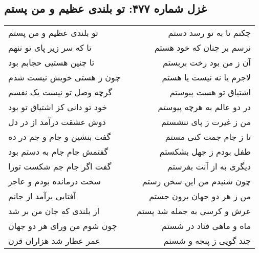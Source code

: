 \begin{center}
\section*{غزل شماره ۴۷۷: تو بلندی عظیم و من پستم}
\label{sec:477}
\begin{longtable}{l p{0.5cm} r}
تو بلندی عظیم و من پستم
&&
چکنم تا به تو رسد دستم
\\
تا که سر زیر پای تو ننهم
&&
نرسم بر چنان که خود هستم
\\
تا چنین هستیی حجابم بود
&&
آن ز من بود رخت بربستم
\\
چون ز هستی خویش نیست شدم
&&
لاجرم یا نه نیست یا هستم
\\
گرچه وصل تو نیست یک نفسم
&&
اشتیاق تو هست پیوستم
\\
خود تو دانی کز اشتیاق تو بود
&&
در دو عالم به هرچه پیوستم
\\
دوش عشقت درآمد از در دل
&&
من ز غیرت ز پای ننشستم
\\
گفت بنشین و جام و جم در ده
&&
تا ز جام جمت کنی مستم
\\
گفتمش جام جام به دستم بود
&&
طفل بودم ز جهل بشکستم
\\
گفت اگر جام جم شکست تورا
&&
دیگری به از آنت بفرستم
\\
سخت درمانده بودم و عاجز
&&
چون شنیدم من این سخن رستم
\\
آفتابی برآمد از جانم
&&
من ز هر دو جهان برون جستم
\\
از بلندی که جان من بر شد
&&
عرش و کرسی به جمله شد پستم
\\
چون شوم من ورای هر دو جهان
&&
ماه و ماهی فتاد در شستم
\\
عمر عطار شد هزاران قرن
&&
چند گویی ز پنجه و شستم
\\
\end{longtable}
\end{center}
